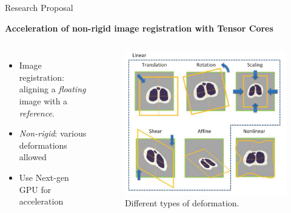 \begin{frame}{Research Proposal}
	\begin{center}
		\textbf{Acceleration of non-rigid image registration with Tensor Cores}
	\end{center}
	\begin{columns}
		\begin{itemize}
			\item Image registration: aligning a \emph{floating} image with a \emph{reference}.
			\item \emph{Non-rigid}: various deformations allowed
			\item Use Next-gen GPU for acceleration
		\end{itemize}

		\begin{figure}
			\includegraphics[width=\textwidth]{registration}
			\caption[Deformations]{Different types of deformation.}
			\label{fig:registration}	
		\end{figure}

	\end{columns}
	
\end{frame}
